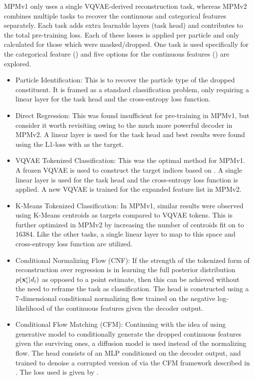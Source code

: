 MPMv1 only uses a single VQVAE-derived reconstruction task, whereas MPMv2 combines multiple tasks to recover the continuous and categorical features separately.
Each task adds extra learnable layers (task head) and contributes to the total pre-training loss.
Each of these losses is applied per particle and only calculated for those which were masked/dropped.
One task is used specifically for the categorical feature (\xid) and five options for the continuous features (\xc) are explored.

\begin{itemize}
    \item Particle Identification: This is to recover the particle type \xid of the dropped constituent.
          It is framed as a standard classification problem, only requiring a linear layer for the task head and the cross-entropy loss function.
    \item Direct Regression: This was found insufficient for pre-training in MPMv1, but consider it worth revisiting owing to the much more powerful decoder in MPMv2.
          A linear layer is used for the task head and best results were found using the L1-loss with \xc as the target.
    \item VQVAE Tokenized Classification: This was the optimal method for MPMv1.
          A frozen VQVAE is used to construct the target indices based on \xc.
          A single linear layer is used for the task head and the cross-entropy loss function is applied.
          A new VQVAE is trained for the expanded feature list in MPMv2.
    \item K-Means Tokenized Classification: In MPMv1, similar results were observed using K-Means centroids as targets compared to VQVAE tokens.
          This is further optimized in MPMv2 by increasing the number of centroids fit on \xc to 16384.
          Like the other tasks, a single linear layer to map to this space and cross-entropy loss function are utilized.
    \item Conditional Normalizing Flow (CNF): If the strength of the tokenized form of reconstruction over regression is in learning the full posterior distribution $p(\mathbf{x}^\text{c}_i|d_i)$ as opposed to a point estimate, then this can be achieved without the need to reframe the task as classification.
          The head is constructed using a 7-dimensional conditional normalizing flow trained on the negative log-likelihood of the continuous features given the decoder output.
    \item Conditional Flow Matching (CFM): Continuing with the idea of using generative model to conditionally generate the dropped continuous features given the surviving ones, a diffusion model is used instead of the normalizing flow.
          The head consists of an MLP conditioned on the decoder output, and trained to denoise a corrupted version of \xc via the CFM framework described in .
          The loss used is given by .
\end{itemize}

